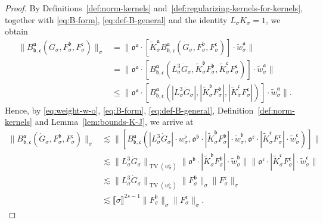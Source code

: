 \documentclass{article}
\numberwithin{equation}{section}
\theoremstyle{plain}
\theoremstyle{definition}
\begin{document}
\begin{proof}
  By Definitions~\ref{def:norm-kernels}
  and~\ref{def:regularizing-kernels-for-kernels}, together with
  \eqref{eq:B-form}, \eqref{eq:def-B-general} and the identity $L_{\sigma}
  K_{\sigma} = 1$, we obtain
  \begin{align*}
    \| B^{\mathfrak{a}}_{\mathfrak{b}, \mathfrak{c}} (\dot{G}_{\sigma},
    F^{\mathfrak{b}}_{\sigma}, F^{\mathfrak{c}}_{\sigma}) \|_{\sigma} &=  \|
    \mathfrak{o}^{\mathfrak{a}} \cdot [\tilde{K}_{\sigma}^{\mathfrak{a}}
    B^{\mathfrak{a}}_{\mathfrak{b}, \mathfrak{c}} (\dot{G}_{\sigma},
    F^{\mathfrak{b}}_{\sigma}, F^{\mathfrak{c}}_{\sigma})] \cdot
    \tilde{w}_{\sigma}^{\mathfrak{a}} \|\\
 &=  \| \mathfrak{o}^{\mathfrak{a}} \cdot
    [B^{\mathfrak{a}}_{\mathfrak{b}, \mathfrak{c}} (L_{\sigma}^3
    \dot{G}_{\sigma}, \tilde{K}_{\sigma}^{\mathfrak{b}}
    F^{\mathfrak{b}}_{\sigma}, \tilde{K}_{\sigma}^{\mathfrak{c}}
    F^{\mathfrak{c}}_{\sigma})] \cdot \tilde{w}_{\sigma}^{\mathfrak{a}}
    \|\\
 &\leqslant  \| \mathfrak{o}^{\mathfrak{a}} \cdot
    [B^{\mathfrak{a}}_{\mathfrak{b}, \mathfrak{c}} (| L_{\sigma}^3
    \dot{G}_{\sigma} |, | \tilde{K}_{\sigma}^{\mathfrak{b}}
    F^{\mathfrak{b}}_{\sigma} |, | \tilde{K}_{\sigma}^{\mathfrak{c}}
    F^{\mathfrak{c}}_{\sigma} |)] \cdot \tilde{w}_{\sigma}^{\mathfrak{a}}
    \| .
  \end{align*}
  Hence, by \eqref{eq:weight-w-o}, \eqref{eq:B-form},
  \eqref{eq:def-B-general}, Definition~\ref{def:norm-kernels} and
  Lemma~\ref{lem:bounds-K-J}, we arrive at
  \begin{align*}
    \| B^{\mathfrak{a}}_{\mathfrak{b}, \mathfrak{c}} (\dot{G}_{\sigma},
    F^{\mathfrak{b}}_{\sigma}, F^{\mathfrak{c}}_{\sigma}) \|_{\sigma} &\lesssim  \| [B^{\mathfrak{a}}_{\mathfrak{b}, \mathfrak{c}} (|
    L_{\sigma}^3 \dot{G}_{\sigma} | \cdot w_{\sigma}^{\flat},
    \mathfrak{o}^{\mathfrak{b}} \cdot | \tilde{K}_{\sigma}^{\mathfrak{b}}
    F^{\mathfrak{b}}_{\sigma} | \cdot \tilde{w}_{\sigma}^{\mathfrak{b}},
    \mathfrak{o}^{\mathfrak{c}} \cdot | \tilde{K}_{\sigma}^{\mathfrak{c}}
    F^{\mathfrak{c}}_{\sigma} | \cdot \tilde{w}_{\sigma}^{\mathfrak{c}})]
    \|\\
 &\lesssim  \| L_{\sigma}^3 \dot{G}_{\sigma} \|_{\operatorname{TV}
    (w_{\sigma}^{\flat})}  \| \mathfrak{o}^{\mathfrak{b}} \cdot |
    \tilde{K}_{\sigma}^{\mathfrak{b}} F^{\mathfrak{b}}_{\sigma} | \cdot
    \tilde{w}_{\sigma}^{\mathfrak{b}} \|   \| \mathfrak{o}^{\mathfrak{c}}
    \cdot | \tilde{K}_{\sigma}^{\mathfrak{c}} F^{\mathfrak{c}}_{\sigma} |
    \cdot \tilde{w}_{\sigma}^{\mathfrak{c}} \| \\
 &\lesssim  \| L_{\sigma}^3 \dot{G}_{\sigma} \|_{\operatorname{TV}
    (w_{\sigma}^{\flat})}  \| F^{\mathfrak{b}}_{\sigma} \|_{\sigma}  \|
    F^{\mathfrak{c}}_{\sigma} \|_{\sigma}\\
 &\lesssim  \llbracket \sigma \rrbracket^{2 s - 1}  \|
    F^{\mathfrak{b}}_{\sigma} \|_{\sigma}  \| F^{\mathfrak{c}}_{\sigma}
    \|_{\sigma} .
  \end{align*}
  

\end{proof}
\end{document}
